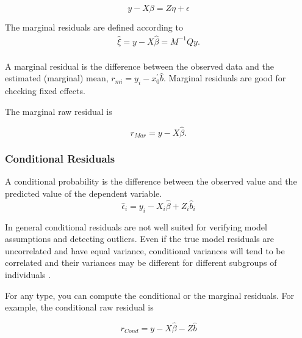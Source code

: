 \documentclass[12pt, a4paper]{report}
\theoremstyle{plain}
\theoremstyle{definition}
\theoremstyle{remark}
\begin{document}
	\[y - X\beta = Z \eta +\epsilon \]
	
	
		The marginal residuals are defined according to
	\begin{eqnarray*}
		\hat{\xi} = y - X\hat{\beta} = M^{-1}Qy. \\\nonumber
	\end{eqnarray*}
	
A marginal residual is the difference between the observed data and the estimated (marginal) mean, $r_{mi} = y_i - x_0^{\prime} \hat{b}$. 	Marginal residuals are good for checking fixed effects.	

The marginal raw residual is
	
	
	
	\[ r_{Mar} = y - X \hat{\beta}. \]
	
	
	\subsubsection{Conditional Residuals}
	A conditional probability is the difference between the observed value and the predicted value of the dependent variable.
	\begin{equation*}
	\hat{\epsilon}_{i} = y_{i} - X_{i}\hat{\beta} + Z_{i}\hat{b}_{i}
	\end{equation*}
	
	In general conditional residuals are not well suited for verifying model assumptions and detecting outliers. Even if the true model residuals are uncorrelated and have equal variance, conditional variances will tend to be correlated and their variances may be different for different subgroups of individuals \citep{west}.
	
%	
%	
	
	For any type, you can compute the conditional or the marginal residuals. For example, the conditional raw residual is
	
	
	\[ r_{Cond} = y - X \hat{\beta} - Z \hat{b} \]
	
\end{document}
